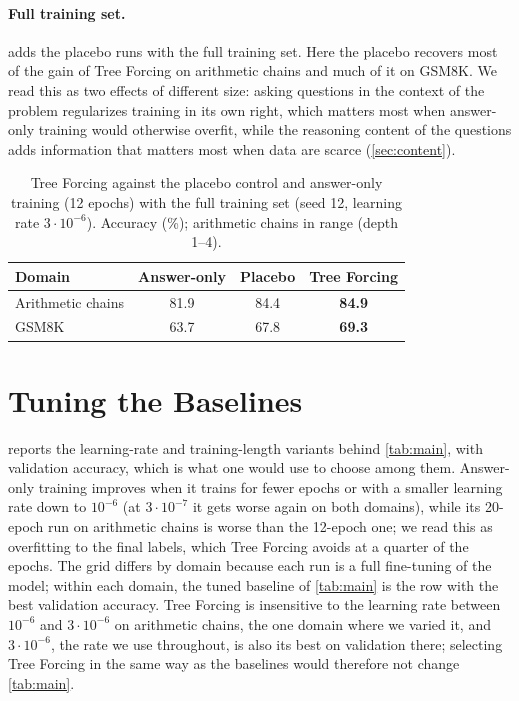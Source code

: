 \documentclass{article}
\newcommand{\tf}{Tree Forcing}
\begin{document}
\paragraph{Full training set.}  adds the placebo runs with the full training set. Here the
placebo recovers most of the gain of \tf{} on arithmetic chains and much of it on GSM8K. We read this as two effects
of different size: asking questions in the context of the problem regularizes training in its own right, which matters
most when answer-only training would otherwise overfit, while the reasoning content of the questions adds information
that matters most when data are scarce (\cref{sec:content}).

\begin{table}[h]
\centering
\small
\caption{\tf{} against the placebo control and answer-only training (12 epochs) with the full training set (seed 12,
learning rate $3\cdot10^{-6}$). Accuracy (\%); arithmetic chains in range (depth 1--4).}
\label{tab:placebo-full}
\begin{tabular}{lccc}
\toprule
Domain & Answer-only & Placebo & \tf{} \\
\midrule
Arithmetic chains & 81.9 & 84.4 & \textbf{84.9} \\
GSM8K & 63.7 & 67.8 & \textbf{69.3} \\
\bottomrule
\end{tabular}
\end{table}

\section{Tuning the Baselines}
\label{app:tuning}

 reports the learning-rate and training-length variants behind \cref{tab:main}, with validation
accuracy, which is what one would use to choose among them. Answer-only training improves when it trains for fewer
epochs or with a smaller learning rate down to $10^{-6}$ (at $3\cdot10^{-7}$ it gets worse again on both domains), while
its 20-epoch run on arithmetic chains is worse than the 12-epoch one; we
read this as overfitting to the final labels, which \tf{} avoids at a quarter of the epochs. The grid differs by
domain because each run is a full fine-tuning of the model; within each domain, the tuned baseline of \cref{tab:main}
is the row with the best validation accuracy. \tf{} is insensitive to the learning rate between $10^{-6}$ and
$3\cdot10^{-6}$ on arithmetic chains, the one domain where we varied it, and $3\cdot10^{-6}$, the rate we use
throughout, is also its best on validation there; selecting \tf{} in the same way as the baselines would therefore not
change \cref{tab:main}.
\end{document}
